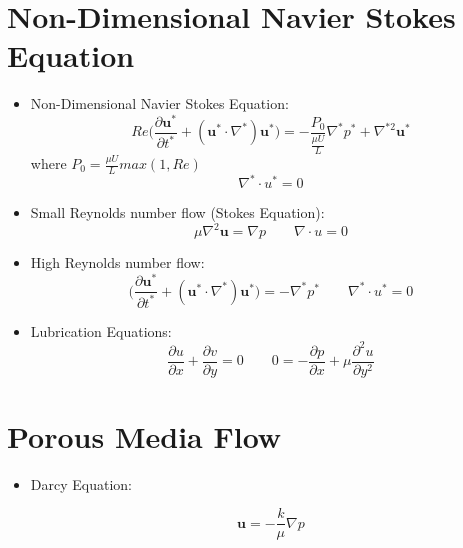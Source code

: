 \documentclass{article}
\begin{document}
\section{Non-Dimensional Navier Stokes Equation}
\begin{itemize}
    \item Non-Dimensional Navier Stokes Equation:\\
     \[ Re\bigg(\frac{\partial \mathbf{u^{*}}}{\partial t^{*}} + (\mathbf{u^{*}}\cdot \nabla^{*})\mathbf{u^{*}} \bigg) = -\frac{P_{0}}{\frac{\mu U}{L}}\nabla^{*} p^{*} + \nabla^{*2}\mathbf{u^{*}}\]
where $\displaystyle P_{0} = \frac{\mu U}{L}max(1,Re)$
     \[ \nabla^{*} \cdot u^{*} = 0\]
     
     \item Small Reynolds number flow (Stokes Equation):
     \[\mu \nabla^{2}\mathbf{u} = \nabla p
     \quad \quad
     \nabla \cdot u = 0\]

     \item High Reynolds number flow:
     \[ \bigg(\frac{\partial \mathbf{u^{*}}}{\partial t^{*}} + (\mathbf{u^{*}}\cdot \nabla^{*})\mathbf{u^{*}} \bigg) = -\nabla^{*} p^{*}
     \quad \quad
     \nabla^{*} \cdot u^{*} = 0\]
    
    \item Lubrication Equations:
    \[\frac{\partial u}{\partial x} + \frac{\partial v}{\partial y} = 0 
    \quad \quad 
    0 = -\frac{\partial p}{\partial x} + \mu \frac{\partial^{2} u}{\partial y^{2}}\]
\end{itemize}


\section{Porous Media Flow}
\begin{itemize}
 \item Darcy Equation:\\
 \begin{minipage}{0.5\textwidth}
 \[\mathbf{u} = -\frac{k}{\mu} \nabla p\]
 \end{minipage}
 \begin{minipage}{0.4\textwidth}
    \begin{itemize}
    \end{itemize}
 \end{minipage}
\end{itemize}
\end{document}

